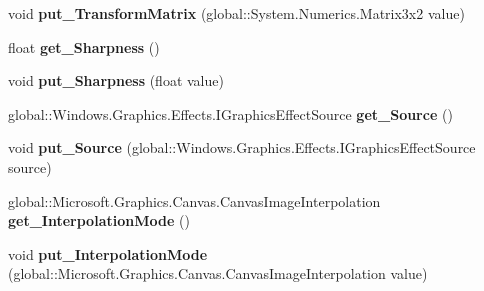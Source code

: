 \begin{DoxyCompactItemize}
void {\bfseries put\+\_\+\+Transform\+Matrix} (global\+::\+System.\+Numerics.\+Matrix3x2 value)
\item 
\mbox{\label{interface_microsoft_1_1_graphics_1_1_canvas_1_1_effects_1_1_i_transform2_d_effect_a68ba1c90a21490b6ceaa03f39f1a1c01}} 
float {\bfseries get\+\_\+\+Sharpness} ()
\item 
\mbox{\label{interface_microsoft_1_1_graphics_1_1_canvas_1_1_effects_1_1_i_transform2_d_effect_aa2e12a86a9e8cf3335707e71b6601b29}} 
void {\bfseries put\+\_\+\+Sharpness} (float value)
\item 
\mbox{\label{interface_microsoft_1_1_graphics_1_1_canvas_1_1_effects_1_1_i_transform2_d_effect_a808f1b49b9663c0610d2495cf643268f}} 
global\+::\+Windows.\+Graphics.\+Effects.\+I\+Graphics\+Effect\+Source {\bfseries get\+\_\+\+Source} ()
\item 
\mbox{\label{interface_microsoft_1_1_graphics_1_1_canvas_1_1_effects_1_1_i_transform2_d_effect_ae417421258d1e16d1da95390cce154d5}} 
void {\bfseries put\+\_\+\+Source} (global\+::\+Windows.\+Graphics.\+Effects.\+I\+Graphics\+Effect\+Source source)
\item 
\mbox{\label{interface_microsoft_1_1_graphics_1_1_canvas_1_1_effects_1_1_i_transform2_d_effect_a28c7f549ffaf7fe034240f0365a040f5}} 
global\+::\+Microsoft.\+Graphics.\+Canvas.\+Canvas\+Image\+Interpolation {\bfseries get\+\_\+\+Interpolation\+Mode} ()
\item 
\mbox{\label{interface_microsoft_1_1_graphics_1_1_canvas_1_1_effects_1_1_i_transform2_d_effect_a864876e7bc5994cb6e25e49e9a00b3bb}} 
void {\bfseries put\+\_\+\+Interpolation\+Mode} (global\+::\+Microsoft.\+Graphics.\+Canvas.\+Canvas\+Image\+Interpolation value)
\item 
\mbox{\label{interface_microsoft_1_1_graphics_1_1_canvas_1_1_effects_1_1_i_transform2_d_effect_abd77cabb47b8cf0111ae871cdedf9046}} 

\end{DoxyCompactItemize}
